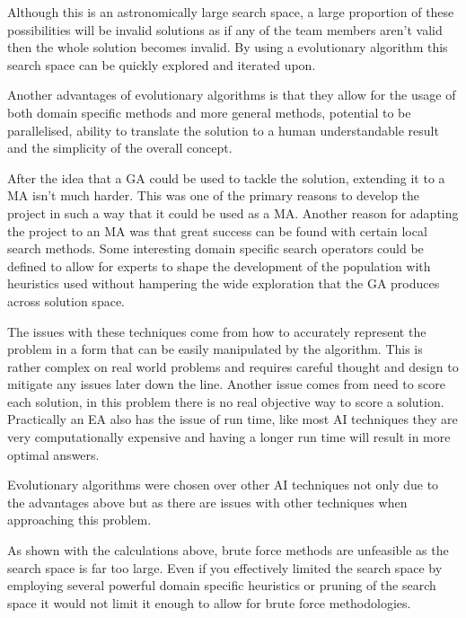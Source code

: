 \documentclass[a4paper]{article}
\begin{document}
\par
Although this is an astronomically large search space, a large proportion of these possibilities will be invalid solutions as if any of the team members aren't valid then the whole solution becomes invalid.
By using a evolutionary algorithm this search space can be quickly explored and iterated upon.
\par
Another advantages of evolutionary algorithms is that they allow for the usage of both domain specific methods and more general methods, potential to be parallelised, ability to translate the solution to a human understandable result and the simplicity of the overall concept.
\\ \par
After the idea that a GA could be used to tackle the solution, extending it to a MA isn't much harder.
This was one of the primary reasons to develop the project in such a way that it could be used as a MA\@.
Another reason for adapting the project to an MA was that great success can be found with certain local search methods.
Some interesting domain specific search operators could be defined to allow for experts to shape the development of the population with heuristics used without hampering the wide exploration that the GA produces across solution space.
\\ \par
The issues with these techniques come from how to accurately represent the problem in a form that can be easily manipulated by the algorithm.
This is rather complex on real world problems and requires careful thought and design to mitigate any issues later down the line.
Another issue comes from need to score each solution, in this problem there is no real objective way to score a solution.
Practically an EA also has the issue of run time, like most AI techniques they are very computationally expensive and having a longer run time will result in more optimal answers.
\\ \par
Evolutionary algorithms were chosen over other AI techniques not only due to the advantages above but as there are issues with other techniques when approaching this problem.
\par
As shown with the calculations above, brute force methods are unfeasible as the search space is far too large.
Even if you effectively limited the search space by employing several powerful domain specific heuristics or pruning of the search space it would not limit it enough to allow for brute force methodologies.
\end{document}
